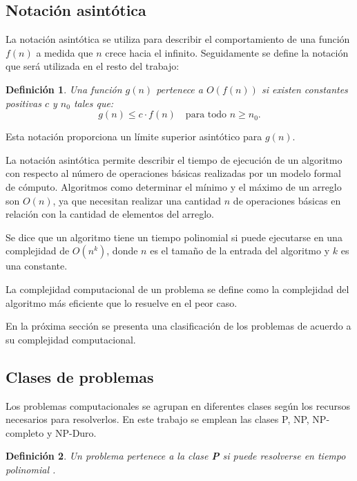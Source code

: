 \documentclass[12pt]{article}
\newtheorem{definition}{Definición}
\begin{document}
\subsection{Notación asintótica}

La notación asintótica se utiliza para describir el comportamiento de una función $f(n)$ a medida que $n$ crece hacia el infinito.  Seguidamente se define la notación que será utilizada en el resto del trabajo:

\begin{definition}
  Una función $g(n)$ pertenece a $O(f(n))$ si existen constantes positivas $c$ y $n_0$ tales que:
  \[
    g(n) \leq c \cdot f(n) \quad \text{para todo } n \geq n_0.
  \]
\end{definition}

Esta notación proporciona un límite superior asintótico para $g(n)$.

La notación asintótica permite describir el tiempo de ejecución de un algoritmo con respecto al número de 
operaciones básicas realizadas por un modelo formal de cómputo.  Algoritmos como determinar el mínimo y el 
máximo de un arreglo son $O(n)$, ya que necesitan realizar una cantidad $n$ de operaciones básicas en relación
con la cantidad de elementos del arreglo.

Se dice que un algoritmo tiene un tiempo polinomial si puede ejecutarse en una complejidad de $O(n^k)$, donde $n$ es el tamaño de la entrada del algoritmo y $k$
es una constante.

La complejidad computacional de un problema se define como la complejidad del algoritmo más eficiente que lo resuelve en el peor caso.


En la próxima sección se presenta una clasificación de los problemas de acuerdo a su complejidad computacional.
\subsection{Clases de problemas}
\label{sec:problemsCategory}

Los problemas computacionales \cite{authomataTheory} se agrupan en diferentes clases según los recursos 
necesarios para resolverlos. En este trabajo se emplean las clases P, NP, NP-completo y NP-Duro.

\begin{definition}
  Un problema pertenece a la clase \textbf{P} si puede resolverse en tiempo polinomial \cite{authomataTheory}.
\end{definition}
\end{document}
